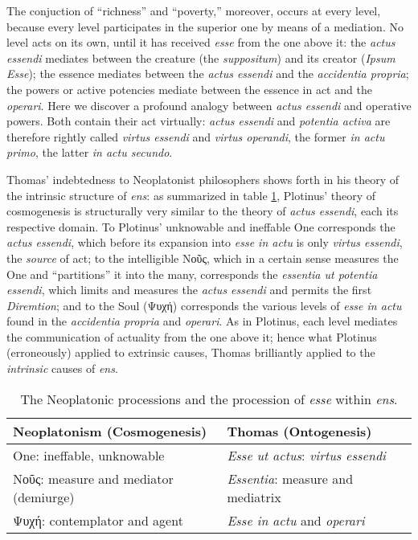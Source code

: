 The conjuction of “richness” and “poverty,” moreover, occurs at every level, because every level participates in the superior one by means of a mediation. No level acts on its own, until it has received \emph{esse} from the one above it: the \emph{actus essendi} mediates between the creature (the \emph{suppositum}) and its creator (\emph{Ipsum Esse}); the essence mediates between the \emph{actus essendi} and the \emph{accidentia propria}; the powers or active potencies mediate between the essence in act and the \emph{operari}. Here we discover a profound analogy between \emph{actus essendi} and operative powers. Both contain their act virtually: \emph{actus essendi} and \emph{potentia activa} are therefore rightly called \emph{virtus essendi} and \emph{virtus operandi}, the former \emph{in actu primo}, the latter \emph{in actu secundo}.

Thomas’ indebtedness to Neoplatonist philosophers shows forth in his theory of the intrinsic structure of \emph{ens}: as summarized in table \ref{tab:neoplatonism-thomas}, Plotinus’ theory of cosmogenesis is structurally very similar to the theory of \emph{actus essendi}, each its respective domain. To Plotinus’ unknowable and ineffable One corresponds the \emph{actus essendi}, which before its expansion into \emph{esse in actu} is only \emph{virtus essendi}, the \emph{source} of act; to the intelligible Νοῦς, which in a certain sense measures the One and “partitions” it into the many, corresponds the \emph{essentia ut potentia essendi}, which limits and measures the \emph{actus essendi} and permits the first \emph{Diremtion}; and to the Soul (Ψυχή) corresponds the various levels of \emph{esse in actu} found in the \emph{accidentia propria} and \emph{operari}. As in Plotinus, each level mediates the communication of actuality from the one above it; hence what Plotinus (erroneously) applied to extrinsic causes, Thomas brilliantly applied to the \emph{intrinsic} causes of \emph{ens}.
%
\begin{table}
  \centering
  \begin{OnehalfSpacing}
    \begin{tabular}{lll}
      \toprule
         \textbf{Neoplatonism} (Cosmogenesis) & \textbf{Thomas} (Ontogenesis) \\
      \midrule
         One: ineffable, unknowable & \emph{Esse ut actus}: \emph{virtus essendi} \\
         Νοῦς: measure and mediator (demiurge)
                                    & \emph{Essentia}: measure and mediatrix \\
         Ψυχή: contemplator and agent & \emph{Esse in actu} and \emph{operari}  \\
      \bottomrule
    \end{tabular}
  \end{OnehalfSpacing}
  \caption{The Neoplatonic processions and the procession
           of \emph{esse} within \emph{ens}.}
  \label{tab:neoplatonism-thomas}
\end{table}
%


